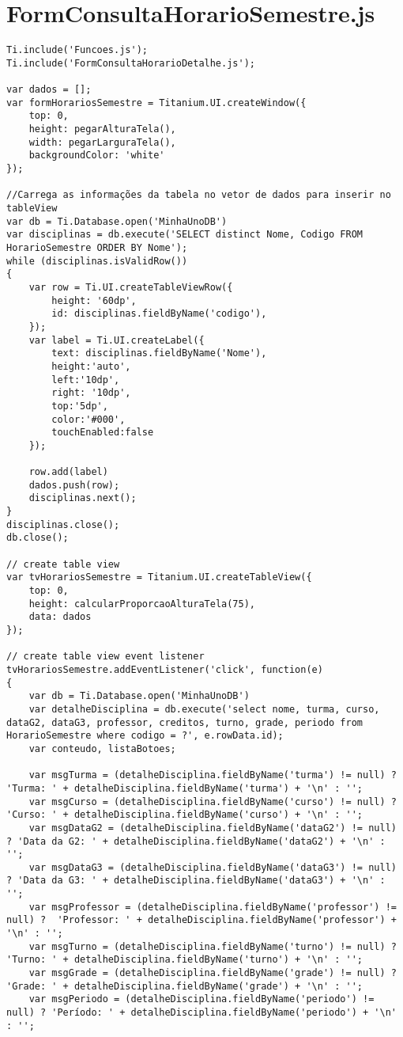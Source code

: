 \section{FormConsultaHorarioSemestre.js}
\begin{lstlisting}
Ti.include('Funcoes.js');
Ti.include('FormConsultaHorarioDetalhe.js');

var dados = [];
var formHorariosSemestre = Titanium.UI.createWindow({
	top: 0,
	height: pegarAlturaTela(),
	width: pegarLarguraTela(),
	backgroundColor: 'white'
});

//Carrega as informações da tabela no vetor de dados para inserir no tableView
var db = Ti.Database.open('MinhaUnoDB')
var disciplinas = db.execute('SELECT distinct Nome, Codigo FROM HorarioSemestre ORDER BY Nome');
while (disciplinas.isValidRow())
{
	var row = Ti.UI.createTableViewRow({
		height: '60dp',
		id: disciplinas.fieldByName('codigo'),
	});
	var label = Ti.UI.createLabel({
		text: disciplinas.fieldByName('Nome'),
		height:'auto',
		left:'10dp',
		right: '10dp',
		top:'5dp',
		color:'#000',
		touchEnabled:false
	});
	
	row.add(label)
	dados.push(row);
	disciplinas.next();
}
disciplinas.close();
db.close();

// create table view
var tvHorariosSemestre = Titanium.UI.createTableView({
	top: 0,
	height: calcularProporcaoAlturaTela(75),
	data: dados
});
 
// create table view event listener
tvHorariosSemestre.addEventListener('click', function(e)
{
	var db = Ti.Database.open('MinhaUnoDB')
	var detalheDisciplina = db.execute('select nome, turma, curso, dataG2, dataG3, professor, creditos, turno, grade, periodo from HorarioSemestre where codigo = ?', e.rowData.id);
	var conteudo, listaBotoes;
	
	var msgTurma = (detalheDisciplina.fieldByName('turma') != null) ? 'Turma: ' + detalheDisciplina.fieldByName('turma') + '\n' : '';
	var msgCurso = (detalheDisciplina.fieldByName('curso') != null) ? 'Curso: ' + detalheDisciplina.fieldByName('curso') + '\n' : '';
	var msgDataG2 = (detalheDisciplina.fieldByName('dataG2') != null) ? 'Data da G2: ' + detalheDisciplina.fieldByName('dataG2') + '\n' : '';
	var msgDataG3 = (detalheDisciplina.fieldByName('dataG3') != null) ? 'Data da G3: ' + detalheDisciplina.fieldByName('dataG3') + '\n' : '';
	var msgProfessor = (detalheDisciplina.fieldByName('professor') != null) ?  'Professor: ' + detalheDisciplina.fieldByName('professor') + '\n' : '';
	var msgTurno = (detalheDisciplina.fieldByName('turno') != null) ? 'Turno: ' + detalheDisciplina.fieldByName('turno') + '\n' : '';
	var msgGrade = (detalheDisciplina.fieldByName('grade') != null) ? 'Grade: ' + detalheDisciplina.fieldByName('grade') + '\n' : '';
	var msgPeriodo = (detalheDisciplina.fieldByName('periodo') != null) ? 'Período: ' + detalheDisciplina.fieldByName('periodo') + '\n' : '';
	

\end{lstlisting}
